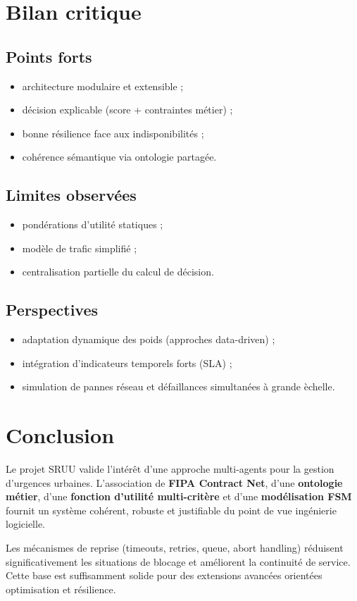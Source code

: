 \documentclass[12pt,a4paper]{article}
\begin{document}
\section{Bilan critique}
\subsection{Points forts}
\begin{itemize}
    \item architecture modulaire et extensible ;
    \item d\'ecision explicable (score + contraintes m\'etier) ;
    \item bonne r\'esilience face aux indisponibilit\'es ;
    \item coh\'erence s\'emantique via ontologie partag\'ee.
\end{itemize}

\subsection{Limites observ\'ees}
\begin{itemize}
    \item pond\'erations d'utilit\'e statiques ;
    \item mod\`ele de trafic simplifi\'e ;
    \item centralisation partielle du calcul de d\'ecision.
\end{itemize}

\subsection{Perspectives}
\begin{itemize}
    \item adaptation dynamique des poids (approches data-driven) ;
    \item int\'egration d'indicateurs temporels forts (SLA) ;
    \item simulation de pannes r\'eseau et d\'efaillances simultan\'ees \`a grande \`echelle.
\end{itemize}

\section{Conclusion}
Le projet SRUU valide l'int\'er\^et d'une approche multi-agents pour la gestion d'urgences urbaines. L'association de \textbf{FIPA Contract Net}, d'une \textbf{ontologie m\'etier}, d'une \textbf{fonction d'utilit\'e multi-crit\`ere} et d'une \textbf{mod\'elisation FSM} fournit un syst\`eme coh\'erent, robuste et justifiable du point de vue ing\'enierie logicielle.

Les m\'ecanismes de reprise (timeouts, retries, queue, abort handling) r\'eduisent significativement les situations de blocage et am\'eliorent la continuit\'e de service. Cette base est suffisamment solide pour des extensions avanc\'ees orient\'ees optimisation et r\'esilience.
\end{document}
